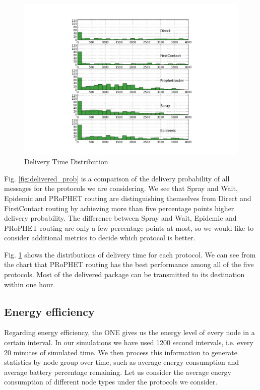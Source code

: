 \documentclass[conference]{IEEEtran}
\begin{document}
\begin{figure}
  \includegraphics[scale=0.4, center]{../one_1.5.1-RC2/plots/Delivery_Time_Distribution.pdf}
  \caption{Delivery Time Distribution}
  \label{fig:time_distribution}
\end{figure}

Fig. \ref{fig:delivered_prob} is a comparison of the delivery probability of all messages for the protocols we are considering. We see that Spray and Wait, Epidemic and PRoPHET routing are distinguishing themselves from Direct and FirstContact routing by achieving more than five percentage points higher delivery probability. The difference between Spray and Wait, Epidemic and PRoPHET routing are only a few percentage points at most, so we would like to consider additional metrics to decide which protocol is better.

Fig. \ref{fig:time_distribution} shows the distributions of delivery time for each protocol. We can see from the chart that PRoPHET routing has the best performance among all of the five protocols. Most of the delivered package can be transmitted to its destination within one hour.

\subsection{Energy efficiency}

Regarding energy efficiency, the ONE gives us the energy level of every node in a certain interval. In our simulations we have used 1200 second intervals, i.e. every 20 minutes of simulated time. We then process this information to generate statistics by node group over time, such as average energy consumption and average battery percentage remaining. Let us consider the average energy consumption of different node types under the protocols we consider.
\end{document}
